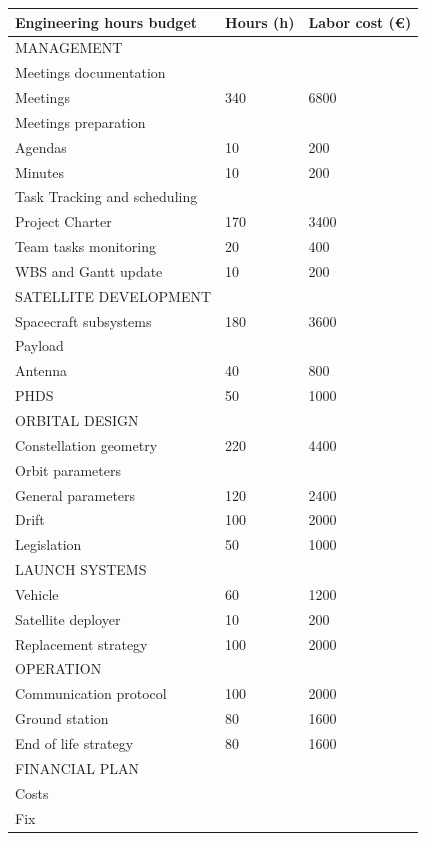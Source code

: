 \begin{tabular}{ | l | l | l | }
\hline
	Engineering hours budget & Hours (h) & Labor cost (\euro) \\ \hline
	MANAGEMENT &  &  \\ \hline
	Meetings documentation &  &  \\ \hline
	Meetings & 340 & 6800 \\ \hline
	Meetings preparation &  &  \\ \hline
	Agendas & 10 & 200 \\ \hline
	Minutes & 10 & 200 \\ \hline
	Task Tracking and scheduling &  &  \\ \hline
	Project Charter & 170 & 3400 \\ \hline
	Team tasks monitoring & 20 & 400 \\ \hline
	WBS and Gantt update & 10 & 200 \\ \hline
	SATELLITE DEVELOPMENT &  &  \\ \hline
	Spacecraft subsystems & 180 & 3600 \\ \hline
	Payload &  &  \\ \hline
	Antenna & 40 & 800 \\ \hline
	PHDS & 50 & 1000 \\ \hline
	ORBITAL DESIGN &  &  \\ \hline
	Constellation geometry & 220 & 4400 \\ \hline
	Orbit parameters &  &  \\ \hline
	General parameters & 120 & 2400 \\ \hline
	Drift & 100 & 2000 \\ \hline
	Legislation & 50 & 1000 \\ \hline
	LAUNCH SYSTEMS &  &  \\ \hline
	Vehicle & 60 & 1200 \\ \hline
	Satellite deployer & 10 & 200 \\ \hline
	Replacement strategy & 100 & 2000 \\ \hline
	OPERATION &  &  \\ \hline
	Communication protocol & 100 & 2000 \\ \hline
	Ground station & 80 & 1600 \\ \hline
	End of life strategy & 80 & 1600 \\ \hline
	FINANCIAL PLAN &  &  \\ \hline
	Costs &  &  \\ \hline
	Fix &  &  \\ \hline

\end{tabular}
